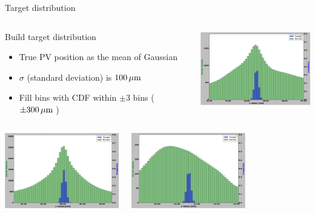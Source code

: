 \begin{frame}{Target distribution}
\vspace{-.8cm}
\begin{columns}[c]
    \begin{block}{Build target distribution}
      \begin{itemize}
          \item True PV position as the mean of Gaussian
          \item $\sigma$ (standard deviation) is $\unit[100]{\mu m}$
          \item Fill bins with CDF within $\pm 3$ bins ($\pm \unit[300]{\mu m}$ )
      \end{itemize}
    \end{block}
      \begin{center}
    \includegraphics[height=3.3cm, trim=18 0 18 0]{images/T_1_25.png}
  \end{center}
  \end{columns}
  \vspace{-.5cm}
  \begin{columns}
      \begin{center}
        \includegraphics[height=3.3cm,trim=18 0 18 0]{images/T_2_25.png}
      \end{center}
      \begin{center}
        \includegraphics[height=3.3cm,trim=18 0 18 0]{images/T_3_25.png}

\end{center}
\end{columns}
\end{frame}
